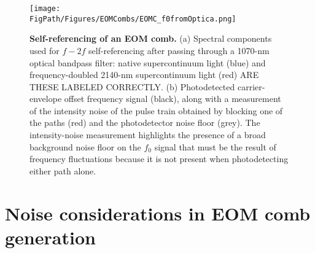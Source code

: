 \begin{figure}[htpb]
	\begin{center}
		\texttt{[image: \\FigPath/Figures/EOMCombs/EOMC\_f0fromOptica.png]}
	\end{center}
	\caption[Figure Title]{\textbf{Self-referencing of an EOM comb.} (a) Spectral components used for $f-2f$ self-referencing after passing through a 1070-nm optical bandpass filter: \color{red}native supercontinuum light (blue) and frequency-doubled 2140-nm supercontinuum light (red) ARE THESE LABELED CORRECTLY\color{black}. (b) Photodetected carrier-envelope offset frequency signal (black), along with a measurement of the intensity noise of the pulse train obtained by \color{red} blocking one of the paths (red) \color{black}and the photodetector noise floor (grey). \color{red}The intensity-noise measurement highlights the presence of a broad background noise floor  on the $f_0$ signal that must be the result of frequency fluctuations because it is not present when photodetecting either path alone.\color{black}}
	\label{fig:EOMC_f0}
\end{figure} 



\section{Noise considerations in EOM comb generation}

